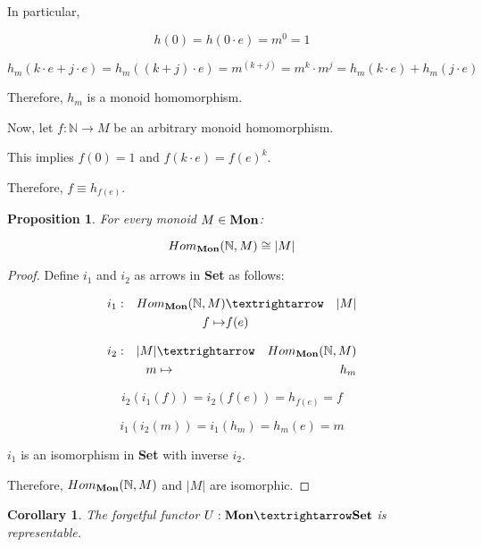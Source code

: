 \documentclass{article}
\newtheorem{proposition}{Proposition}
\newtheorem{corollary}{Corollary}
\begin{document}
\begin{enumerate}
\begin{enumerate}
    In particular,

    $$h(0) = h(0·e) = m^0 = 1$$ 
    
    $$h_m(k·e + j·e) = h_m((k+j)·e) = m^(k+j) = m^k · m^j = h_m(k·e) + h_m(j·e)$$

    Therefore, $h_m$ is a monoid homomorphism.

    Now, let $f : \mathbb{N} → M$ be an arbitrary monoid homomorphism.

    This implies $f(0) = 1$ and $f(k·e) = f(e)^k$.

    Therefore, $f \equiv h_{f(e)}$.

    \begin{proposition}
      For every monoid $M \in \text{\bf Mon}$:

      $$Hom_{\text{\bf Mon}}(\mathbb{N}, M) \cong \vert M \vert$$
    \end{proposition}

    \begin{proof}

      Define $i_1$ and $i_2$ as arrows in {\bf Set} as follows:
      
      \begin{align*}
        i_1 & : & Hom_{\text{\bf Mon}}(\mathbb{N}, M) & →        & \vert M \vert \\      
            &   & f                                \mapsto  & f(e)          \\
      \end{align*}

      \begin{align*}
        i_2 & : & \vert M \vert & →     & Hom_{\text{\bf Mon}}(\mathbb{N}, M) \\
            &   &      m        & \mapsto & h_m                          \\
      \end{align*}

      $$i_2(i_1(f)) = i_2(f(e)) = h_{f(e)} = f$$ 

      $$i_1(i_2(m)) = i_1(h_m) = h_m(e) = m$$

      $i_1$ is an isomorphism in {\bf Set} with inverse $i_2$.

      Therefore, $Hom_{\text{\bf Mon}}(\mathbb{N}, M)$ and $\vert M \vert$ are
      isomorphic.
      
    \end{proof}

    \begin{corollary}
      The forgetful functor $U : \text{\bf Mon} → \text{\bf Set}$
      is representable.


\end{corollary}
\end{enumerate}
\end{enumerate}
\end{document}

